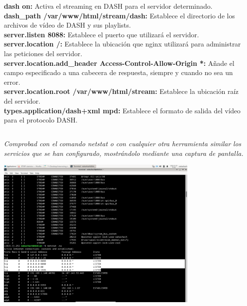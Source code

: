 \documentclass[spanish]{article}
\begin{document}
\textbf{dash on:} Activa el streaming en DASH para el servidor
determinado.\\

\textbf{dash\_path /var/www/html/stream/dash:} Establece el directorio de los archivos de vídeo
de DASH y sus playlists.\\

\textbf{server.listen 8088:} Establece el puerto que utilizará el
servidor.\\

\textbf{server.location /:} Establece la ubicación que nginx
utilizará para administrar las peticiones del servidor.\\

\textbf{server.location.add\_header
Access-Control-Allow-Origin *:}
Añade el campo especificado a una cabecera de respuesta,
siempre y cuando no sea un error.\\

\textbf{server.location.root /var/www/html/stream:} Establece la
ubicación raíz del servidor.\\

\textbf{types.application/dash+xml mpd:} Establece el formato de
salida del vídeo para el protocolo DASH.

\subsection{}

\textit{Comprobad con el comando netstat o con cualquier otra
herramienta similar los servicios que se han configurado,
mostrándolo mediante una captura de pantalla.}

\begin{center}
\includegraphics[width=10cm]{../img/13.png}
\end{center}
\end{document}
